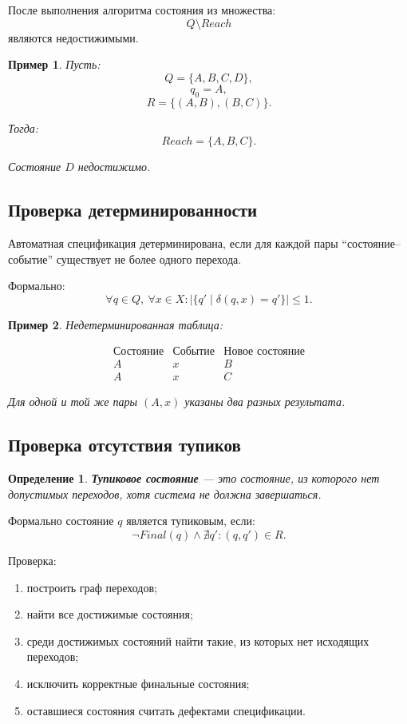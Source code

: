 \documentclass[12pt,a4paper]{article}
\newtheorem{definition}{Определение}
\newtheorem{example}{Пример}
\begin{document}
После выполнения алгоритма состояния из множества:
\[
    Q \setminus Reach
\]
являются недостижимыми.

\begin{example}
Пусть:
\[
    Q = \{A,B,C,D\},
\]
\[
    q_0 = A,
\]
\[
    R = \{(A,B),(B,C)\}.
\]

Тогда:
\[
    Reach = \{A,B,C\}.
\]

Состояние $D$ недостижимо.
\end{example}

\subsection{Проверка детерминированности}

Автоматная спецификация детерминирована, если для каждой пары ``состояние--событие'' существует не более одного перехода.

Формально:
\[
    \forall q \in Q,\ \forall x \in X:
    |\{q' \mid \delta(q,x)=q'\}| \leq 1.
\]

\begin{example}
Недетерминированная таблица:

\[
\begin{array}{c|c|c}
\text{Состояние} & \text{Событие} & \text{Новое состояние} \\
\hline
A & x & B \\
A & x & C
\end{array}
\]

Для одной и той же пары $(A,x)$ указаны два разных результата.
\end{example}

\subsection{Проверка отсутствия тупиков}

\begin{definition}
\textbf{Тупиковое состояние} --- это состояние, из которого нет допустимых переходов, хотя система не должна завершаться.
\end{definition}

Формально состояние $q$ является тупиковым, если:
\[
    \neg Final(q) \land \nexists q' : (q,q') \in R.
\]

Проверка:
\begin{enumerate}
    \item построить граф переходов;
    \item найти все достижимые состояния;
    \item среди достижимых состояний найти такие, из которых нет исходящих переходов;
    \item исключить корректные финальные состояния;
    \item оставшиеся состояния считать дефектами спецификации.
\end{enumerate}
\end{document}
